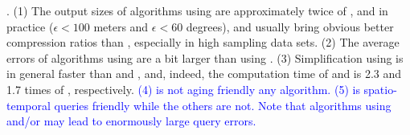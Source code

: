 .
(1) The output sizes of algorithms using \sed are approximately twice of \ped, and in practice (\eg $\epsilon <100$ meters and $\epsilon < 60$ degrees), \ped and \sed usually bring obvious better compression ratios than \dad, especially in high sampling data sets.
%
(2) The average errors of algorithms using \sed are a bit larger than using \ped.
%
(3) Simplification using \dad is in general faster than \ped and \sed, and, indeed, the computation time of \ped and \sed is 2.3 and 1.7 times of \dad, respectively.
%
\textcolor{blue}{(4) \dad is not aging friendly \wrt any algorithm.}
%
\textcolor{blue}{(5) \sed is spatio-temporal queries friendly while the others are not. Note that algorithms using \ped and/or \dad may lead to enormously large query errors.}




